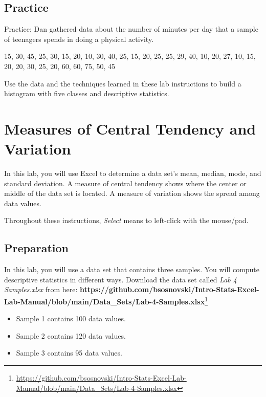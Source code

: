 \documentclass[
  12pt,
  letterpaper,
]{book}
\providecommand{\tightlist}{%
  \setlength{\itemsep}{0pt}\setlength{\parskip}{0pt}}
\DeclareRobustCommand{\href}[2]{#2\footnote{\url{#1}}}
\begin{document}
\hypertarget{practice}{%
\section{Practice}\label{practice}}

Practice:
Dan gathered data about the number of minutes per day that a sample of teenagers spends in doing a physical activity.

15, 30, 45, 25, 30, 15, 20, 10, 30, 40, 25, 15, 20, 25, 25, 29, 40, 10, 20, 27, 10, 15, 20, 20, 30, 25, 20, 60, 60, 75, 50, 45

Use the data and the techniques learned in these lab instructions to build a histogram with five classes and descriptive statistics.

\hypertarget{central-tendency-variation}{%
\chapter{Measures of Central Tendency and Variation}\label{central-tendency-variation}}

In this lab, you will use Excel to determine a data set's mean, median, mode, and standard deviation. A measure of central tendency shows where the center or middle of the data set is located. A measure of variation shows the spread among data values.

Throughout these instructions, \emph{Select} means to left-click with the mouse/pad.

\hypertarget{preparation-1}{%
\section{Preparation}\label{preparation-1}}

In this lab, you will use a data set that contains three samples. You will compute descriptive statistics in different ways. Download the data set called \emph{Lab 4 Samples.xlsx} from here: \href{https://github.com/bsosnovski/Intro-Stats-Excel-Lab-Manual/blob/main/Data_Sets/Lab-4-Samples.xlsx}{\textbf{https://github.com/bsosnovski/Intro-Stats-Excel-Lab-Manual/blob/main/Data\_Sets/Lab-4-Samples.xlsx}}

\begin{itemize}
\tightlist
\item
  Sample 1 contains 100 data values.
\item
  Sample 2 contains 120 data values.
\item
  Sample 3 contains 95 data values.
\end{itemize}
\end{document}
